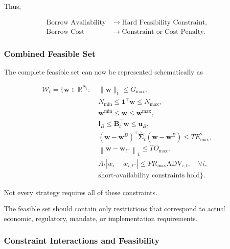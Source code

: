 \documentclass[11pt,a4paper]{article}
\begin{document}
Thus,

\begin{equation}
\boxed{
\begin{aligned}
\text{Borrow Availability}
&\rightarrow
\text{Hard Feasibility Constraint},
\\
\text{Borrow Cost}
&\rightarrow
\text{Constraint or Cost Penalty}.
\end{aligned}
}
\end{equation}


\subsubsection{Combined Feasible Set}

The complete feasible set can now be represented schematically as

\begin{equation}
\boxed{
\begin{aligned}
\mathcal{W}_t
=
\Bigg\{
\mathbf{w}\in\mathbb{R}^{N_t}
:\;
&
\|\mathbf{w}\|_1
\leq
G_{\max},
\\
&
N_{\min}
\leq
\mathbf{1}^{\top}\mathbf{w}
\leq
N_{\max},
\\
&
\mathbf{w}^{\min}
\leq
\mathbf{w}
\leq
\mathbf{w}^{\max},
\\
&
\mathbf{l}_B
\leq
\mathbf{B}_t^\top\mathbf{w}
\leq
\mathbf{u}_B,
\\
&
\left(
\mathbf{w}-\mathbf{w}^{B}
\right)^\top
\widehat{\boldsymbol{\Sigma}}_t
\left(
\mathbf{w}-\mathbf{w}^{B}
\right)
\leq
TE_{\max}^{2},
\\
&
\left\|
\mathbf{w}
-
\mathbf{w}_{t^-}
\right\|_1
\leq
TO_{\max},
\\
&
A_t
|w_i-w_{i,t^-}|
\leq
PR_{\max}
\mathrm{ADV}_{i,t},
\quad
\forall i,
\\
&
\text{short-availability constraints hold}
\Bigg\}.
\end{aligned}
}
\end{equation}

Not every strategy requires all of these constraints.

The feasible set should contain only restrictions that correspond to actual
economic, regulatory, mandate, or implementation requirements.


\subsubsection{Constraint Interactions and Feasibility}
\end{document}
